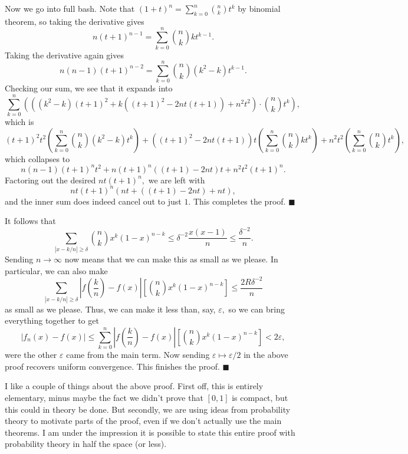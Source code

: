 Now we go into full bash. Note that $(1+t)^n=\sum_{k=0}^n\binom nkt^k$ by binomial theorem, so taking the derivative gives
\[n(t+1)^{n-1}=\sum_{k=0}^n\binom nkkt^{k-1}.\]
Taking the derivative again gives
\[n(n-1)(t+1)^{n-2}=\sum_{k=0}^n\binom nk\left(k^2-k\right)t^{k-1}.\]
Checking our sum, we see that it expands into
\[\sum_{k=0}^{n}\left(\left(\left(k^{2}-k\right)\left(t+1\right)^{2}+k\left(\left(t+1\right)^{2}-2nt\left(t+1\right)\right)+n^{2}t^{2}\right)\cdot\binom nkt^{k}\right),\]
which is
\[\left(t+1\right)^{2}t^2\left(\sum_{k=0}^{n}\binom nk\left(k^{2}-k\right)t^k\right)+\left(\left(t+1\right)^{2}-2nt\left(t+1\right)\right)t\left(\sum_{k=0}^n\binom nkkt^k\right)+n^{2}t^{2}\left(\sum_{k=0}^n\binom nkt^{k}\right),\]
which collapses to
\[n(n-1)\left(t+1\right)^nt^2+n(t+1)^n\left(\left(t+1\right)-2nt\right)t+n^{2}t^2(t+1)^n.\]
Factoring out the desired $nt(t+1)^n,$ we are left with
\[nt(t+1)^n\left(nt+\left(\left(t+1\right)-2nt\right)+nt\right),\]
and the inner sum does indeed cancel out to just $1.$ This completes the proof. $\blacksquare$

It follows that
\[\sum_{|x-k/n|\ge\delta}\binom nkx^k(1-x)^{n-k}\le\delta^{-2}\frac{x(x-1)}n\le\frac{\delta^{-2}}n.\]
Sending $n\to\infty$ now means that we can make this as small as we please. In particular, we can also make
\[\sum_{|x-k/n|\ge\delta}\left|f\left(\textstyle\frac kn\right)-f(x)\right|\left[\binom nkx^k(1-x)^{n-k}\right]\le\frac{2R\delta^{-2}}n\]
as small as we please. Thus, we can make it less than, say, $\varepsilon,$ so we can bring everything together to get
\[|f_n(x)-f(x)|\le\sum_{k=0}^n\left|f\left(\textstyle\frac kn\right)-f(x)\right|\left[\binom nkx^k(1-x)^{n-k}\right]<2\varepsilon,\]
were the other $\varepsilon$ came from the main term. Now sending $\varepsilon\mapsto\varepsilon/2$ in the above proof recovers uniform convergence. This finishes the proof. $\blacksquare$

I like a couple of things about the above proof. First off, this is entirely elementary, minus maybe the fact we didn't prove that $[0,1]$ is compact, but this could in theory be done. But secondly, we are using ideas from probability theory to motivate parts of the proof, even if we don't actually use the main theorems. I am under the impression it is possible to state this entire proof with probability theory in half the space (or less).

